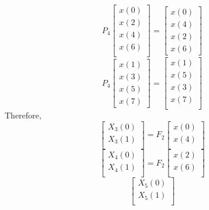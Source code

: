 \documentclass[journal,12pt,twocolumn]{IEEEtran}
\renewcommand\thesection{\arabic{section}}
\begin{document}
\begin{enumerate}[label=\arabic*.,ref=\thesection.\theenumi]
\begin{equation}
P_{4}
\begin{bmatrix}
x(0) \\ 
x(2) \\ 
x(4) \\ 
x(6) \\
\end{bmatrix}
 = 
\begin{bmatrix}
x(0) \\ 
x(4) \\ 
x(2) \\
x(6)
\end{bmatrix}
\end{equation}
\begin{equation}
P_{4}
\begin{bmatrix}
x(1) \\ 
x(3) \\ 
x(5) \\
x(7)
\end{bmatrix}
 = 
\begin{bmatrix}
x(1) \\ 
x(5) \\ 
x(3) \\ 
x(7) \\
\end{bmatrix}
\end{equation}
Therefore,
\begin{equation}
\begin{bmatrix}
X_{3}(0) \\ 
X_{3}(1)\\ 
\end{bmatrix}
= F_{2}
\begin{bmatrix}
x(0) \\ 
x(4) \\ 
\end{bmatrix}
\end{equation}
\begin{equation}
\begin{bmatrix}
X_{4}(0) \\ 
X_{4}(1)\\ 
\end{bmatrix}
= F_{2}
\begin{bmatrix}
x(2) \\ 
x(6) \\ 
\end{bmatrix}
\end{equation}
\begin{equation}
\begin{bmatrix}
X_{5}(0) \\ 
X_{5}(1)\\ 

\end{bmatrix}
\end{equation}
\end{enumerate}
\end{document}
